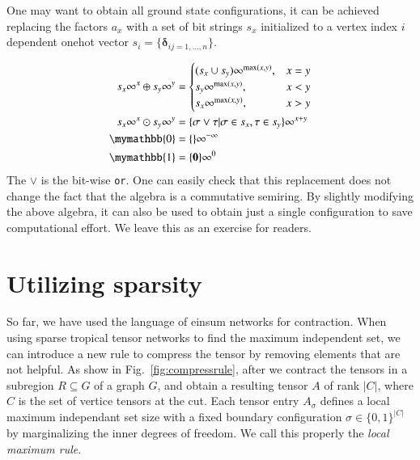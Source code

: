 \documentclass{article}
\newcommand{\<}{\langle}
\renewcommand{\>}{\rangle}
\newcommand{\Fig}[1]{Fig.~\ref{#1}}
\theoremstyle{definition}\newtheorem{definition}{\textit{Definition}}
\begin{document}
One may want to obtain all ground state configurations,
it can be achieved replacing the factors $a_x$ with a set of bit strings $s_x$ initialized to a vertex index $i$ dependent onehot vector $s_i = \{\boldsymbol{\delta}_{ij=1,\ldots,n}\}$.

\begin{align}
\begin{split}
    s_x\infty^x \oplus s_y\infty^y &= \begin{cases}
        (s_x \cup s_y)\infty^{\max(x,y)}, & x = y\\
        s_y\infty^{\max(x,y)}, & x < y\\
        s_x\infty^{\max(x,y)}, & x > y
    \end{cases}\\
    s_x\infty^x \odot s_y\infty^y &= \{\sigma \lor \tau | \sigma \in s_x, \tau \in s_y\}\infty^{x+y}\\
    \mymathbb{0} &= \{\}\infty^{-\infty}\\
    \mymathbb{1} &= \{\boldsymbol 0\}\infty^{0}
\end{split}
\end{align}
The $\vee$ is the bit-wise \texttt{or}. One can easily check that this replacement does not change the fact that the algebra is a commutative semiring.
By slightly modifying the above algebra, it can also be used to obtain just a single configuration to save computational effort.
We leave this as an exercise for readers.

\section{Utilizing sparsity}
So far, we have used the language of einsum networks for contraction.
When using sparse tropical tensor networks to find the maximum independent set, we can introduce a new rule to compress the tensor by removing elements that are not helpful.
As show in \Fig{fig:compressrule}, after we contract the tensors in a subregion $R \subseteq G$ of a graph $G$, and obtain a resulting tensor $A$ of rank $|C|$, where $C$ is the set of vertice tensors at the cut.
Each tensor entry $A_{\sigma}$ defines a local maximum independant set size with a fixed boundary configuration $\sigma \in \{0,1\}^{|C|}$ by marginalizing the inner degrees of freedom.
We call this properly the \textit{local maximum rule}.
\end{document}
